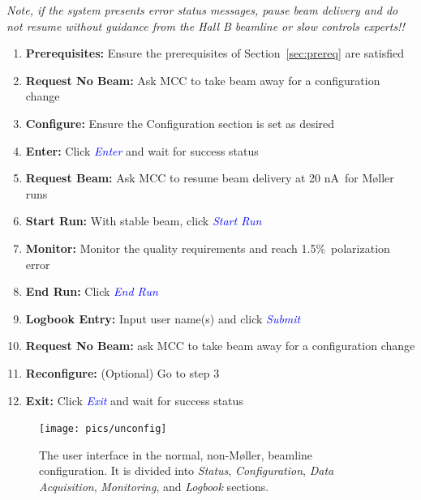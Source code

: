 \documentclass[amsmath,amssymb,notitlepage,12pt]{revtex4}
\newcommand{\ibeam}{20 nA\ }
\newcommand{\easy}{1.5\%}
\begin{document}
{\em Note, if the system presents error status messages, pause beam delivery and do not resume without guidance from the Hall B beamline or slow controls experts!!}
\begin{enumerate}
\vspace{-2mm}\item {\bf Prerequisites:}  Ensure the prerequisites of Section~\ref{sec:prereq} are satisfied
\vspace{-4mm}\item {\bf Request No Beam:}  Ask MCC to take beam away for a configuration change
\vspace{-4mm}\item {\bf Configure:}  Ensure the Configuration section is set as desired
\vspace{-4mm}\item {\bf Enter:} Click \textcolor{blue}{\em Enter} and wait for success status
\vspace{-4mm}\item {\bf Request Beam:} Ask MCC to resume beam delivery at \ibeam for M{\o}ller runs
\vspace{-4mm}\item {\bf Start Run:} With stable beam, click \textcolor{blue}{\em Start Run}
\vspace{-4mm}\item {\bf Monitor:} Monitor the quality requirements and reach \easy\ polarization error
\vspace{-4mm}\item {\bf End Run:} Click \textcolor{blue}{\em End Run}
\vspace{-4mm}\item {\bf Logbook Entry:} Input user name(s) and click \textcolor{blue}{\em Submit}
\vspace{-4mm}\item {\bf Request No Beam:} ask MCC to take beam away for a configuration change
\vspace{-4mm}\item {\bf Reconfigure:} (Optional) Go to step 3
\vspace{-4mm}\item {\bf Exit:} Click \textcolor{blue}{\em Exit} and wait for success status
\end{enumerate}

\begin{figure}[htbp]\centering
    \texttt{[image: pics/unconfig]}
    \caption{\label{fig:beamline}The user interface in the normal, non-M{\o}ller, beamline configuration.  It is divided into {\em Status}, {\em Configuration}, {\em Data Acquisition}, {\em Monitoring}, and {\em Logbook} sections.\label{fig:unconfig}}
\end{figure}
\end{document}
